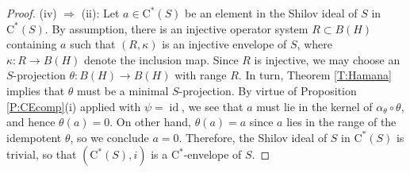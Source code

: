 \documentclass[10pt,a4paper]{amsart}
\newcommand{\id}{\operatorname{id}}
\newcommand{\rC}{\mathrm{C}}
\begin{document}
\begin{proof}
(iv) $\Rightarrow$ (ii): Let $a\in \rC^*(S)$ be an element in the Shilov ideal of $S$ in $\rC^*(S)$. By assumption, there is an injective operator system $R\subset B(H)$  containing $a$ such that $(R,\kappa)$ is an injective envelope of $S$, where $\kappa:R\to B(H)$ denote the inclusion map. Since $R$ is injective, we may choose an $S$-projection $\theta:B(H)\to B(H)$ with range $R$. In turn, Theorem \ref{T:Hamana} implies that $\theta$ must be a minimal $S$-projection.  By virtue of Proposition \ref{P:CEcomp}(i) applied with $\psi=\id$, we see that $a$ must lie in the kernel of $\alpha_\theta\circ \theta$, and hence $\theta(a)=0$. On other hand, $\theta(a)=a$ since $a$ lies in the range of the idempotent $\theta$, so we conclude $a=0$. Therefore, the Shilov ideal of $S$ in $\rC^*(S)$ is trivial, so that $(\rC^*(S),i)$ is a  $\rC^*$-envelope of $S$.
\end{proof}
\end{document}
